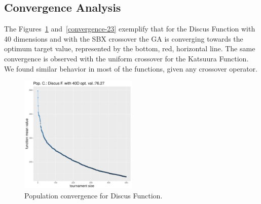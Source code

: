 \subsection{Convergence Analysis}
The Figures~\ref{convegence-11} and~\ref{convergence-23} exemplify that for the Discus Function with 40 dimensions and with the SBX crossover the GA is converging towards the optimum target value, represented by the bottom, red, horizontal line. The same convergence is observed with the uniform crossover for the Katsuura Function. We found similar behavior in most of the functions, given any crossover operator.

\begin{figure}[t]
	\includegraphics[width=0.5\textwidth]{img/2n2n-40D/covergency_unimodal_2n2n_11_dim_40.pdf}
	\caption{Population convergence for Discus Function.}
	\label{convegence-11}
\end{figure}
